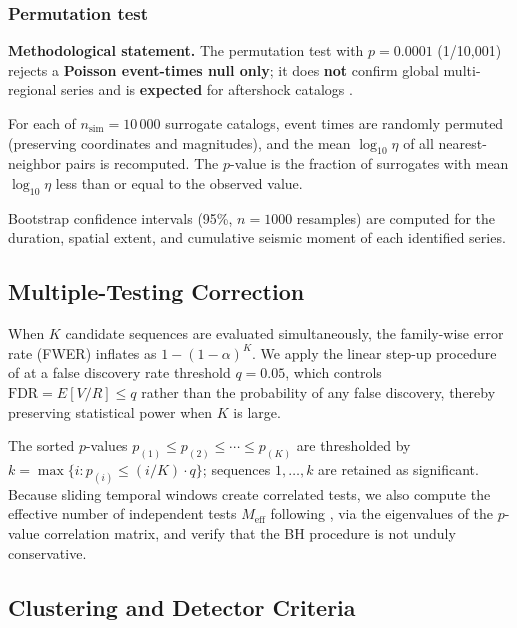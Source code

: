\documentclass[draft]{agujournal2019}
\begin{document}
\subsubsection{Permutation test}
\noindent\textbf{Methodological statement.} The permutation test with
$p = 0.0001$ (1/10{,}001) rejects a \textbf{Poisson event-times null only};
it does \textbf{not} confirm global multi-regional series and is
\textbf{expected} for aftershock catalogs \citep{Ogata1988}.

For each of $n_\mathrm{sim} = 10\,000$ surrogate catalogs, event times
are randomly permuted (preserving coordinates and magnitudes), and the
mean $\log_{10} \eta$ of all nearest-neighbor pairs is recomputed.
The $p$-value is the fraction of surrogates with mean $\log_{10} \eta$
less than or equal to the observed value.

Bootstrap confidence intervals (95\%, $n = 1000$ resamples) are computed
for the duration, spatial extent, and cumulative seismic moment of each
identified series.

\subsection{Multiple-Testing Correction}
\label{subsec:fdr}

When $K$ candidate sequences are evaluated simultaneously, the
family-wise error rate (FWER) inflates as $1 - (1-\alpha)^K$.
We apply the linear step-up procedure of \citet{BenjaminiHochberg1995}
at a false discovery rate threshold $q = 0.05$, which controls
$\mathrm{FDR} = E[V/R] \le q$ rather than the probability of any
false discovery, thereby preserving statistical power when $K$ is large.

The sorted $p$-values $p_{(1)} \le p_{(2)} \le \cdots \le p_{(K)}$
are thresholded by $k = \max\{i : p_{(i)} \le (i/K) \cdot q\}$;
sequences $1, \ldots, k$ are retained as significant.
Because sliding temporal windows create correlated tests, we also
compute the effective number of independent tests $M_\mathrm{eff}$
following \citet{Gao2008}, via the eigenvalues of the $p$-value
correlation matrix, and verify that the BH procedure is not unduly
conservative.

\subsection{Clustering and Detector Criteria}
\label{subsec:criteria}
\end{document}
